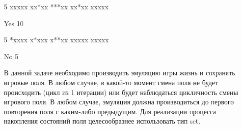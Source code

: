 
\begin{myverbbox}[\small]{\vinput}
    5
    xxxxx
    xx*xx
    ***xx
    xx*xx
    xxxxx
\end{myverbbox}
\begin{myverbbox}[\small]{\voutput}
    Yes
    10
\end{myverbbox}


\begin{myverbbox}[\small]{\vinput}
    5
    *xxxx
    x*xxx
    x**xx
    xxxxx
    xxxxx
\end{myverbbox}
\begin{myverbbox}[\small]{\voutput}
    No
    5
\end{myverbbox}

\solutionSection

В данной задаче необходимо производить эмуляцию игры жизнь и сохранять игровые поля. В любом случае, в какой-то момент смена поля не будет происходить (цикл из 1 итерации) или будет наблюдаться цикличность смены игрового поля. В любом случае, эмуляция должна производиться до первого повторения поля с каким-либо предыдущим. Для реализации процесса накопления состояний поля целесообразнее использовать тип set. 

